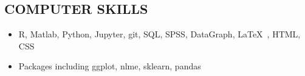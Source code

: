 \documentclass[line,margin,10pt]{res}
\begin{document}
\begin{resume}
  

\section{COMPUTER SKILLS} 
 \begin{itemize}[leftmargin=-2pt] \itemsep -2pt
\item [] R, Matlab, Python, Jupyter, git, SQL, SPSS, DataGraph, \LaTeX\ , HTML, CSS
\item []Packages including ggplot, nlme, sklearn, pandas
 \end{itemize}


\end{resume}
\end{document}
